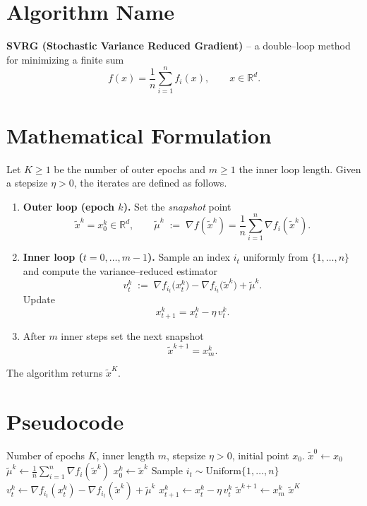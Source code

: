 \documentclass{article}
\begin{document}
\section*{Algorithm Name}
\textbf{SVRG (Stochastic Variance Reduced Gradient)} – a double–loop method for minimizing a finite sum
\[
f(x)=\frac1n\sum_{i=1}^{n}f_i(x),\qquad x\in\mathbb{R}^{d}.
\]

\section*{Mathematical Formulation}
Let $K\ge 1$ be the number of outer epochs and $m\ge 1$ the inner loop length.  
Given a stepsize $\eta>0$, the iterates are defined as follows.

\begin{enumerate}
\item \textbf{Outer loop (epoch $k$).}  Set the \emph{snapshot} point
\[
\tilde{x}^{k}=x_{0}^{k}\in\mathbb{R}^{d},
\qquad 
\tilde{\mu}^{k}\;:=\;\nabla f(\tilde{x}^{k})=\frac1n\sum_{i=1}^{n}\nabla f_i(\tilde{x}^{k}).
\]
\item \textbf{Inner loop ($t=0,\dots,m-1$).}  Sample an index $i_t$ uniformly from $\{1,\dots,n\}$ and compute the variance–reduced estimator
\[
v_t^{k}\;:=\;\nabla f_{i_t}\!\bigl(x_t^{k}\bigr)-\nabla f_{i_t}\!\bigl(\tilde{x}^{k}\bigr)+\tilde{\mu}^{k}.
\]
Update
\[
x_{t+1}^{k}=x_t^{k}-\eta\,v_t^{k}.
\]
\item After $m$ inner steps set the next snapshot
\[
\tilde{x}^{k+1}=x_{m}^{k}.
\]
\end{enumerate}
The algorithm returns $\tilde{x}^{K}$.

\section*{Pseudocode}
\begin{algorithm}[H]
\caption{SVRG}
\begin{algorithmic}[1]
\Require Number of epochs $K$, inner length $m$, stepsize $\eta>0$, initial point $x_0$.
\State $\tilde{x}^{0}\gets x_0$
    \State $\tilde{\mu}^{k}\gets \frac1n\sum_{i=1}^{n}\nabla f_i(\tilde{x}^{k})$ 
    \State $x_0^{k}\gets \tilde{x}^{k}$
        \State Sample $i_t\sim\text{Uniform}\{1,\dots,n\}$
        \State $v_t^{k}\gets \nabla f_{i_t}(x_t^{k})-\nabla f_{i_t}(\tilde{x}^{k})+\tilde{\mu}^{k}$
        \State $x_{t+1}^{k}\gets x_t^{k}-\eta\,v_t^{k}$
    \EndFor
    \State $\tilde{x}^{k+1}\gets x_{m}^{k}$
\EndFor
\State \Return $\tilde{x}^{K}$
\end{algorithmic}
\end{algorithm}
\end{document}
